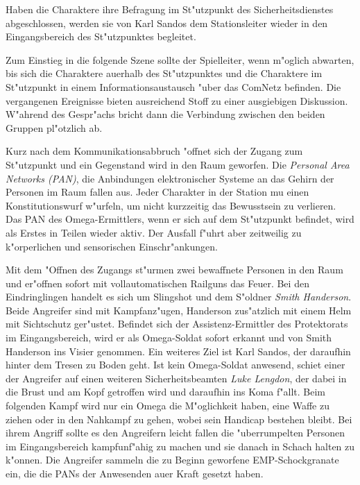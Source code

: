 
Haben die Charaktere ihre Befragung im St"utzpunkt des Sicherheitsdienstes abgeschlossen, werden sie von Karl Sandos dem Stationsleiter wieder in den Eingangsbereich des St"utzpunktes begleitet. 

Zum Einstieg in die folgende Szene sollte der Spielleiter, wenn m"oglich abwarten, bis sich die Charaktere au\3erhalb des St"utzpunktes und die Charaktere im St"utzpunkt in einem Informationsaustausch "uber das ComNetz befinden. Die vergangenen Ereignisse bieten ausreichend Stoff zu einer ausgiebigen Diskussion. W"ahrend des Gespr"achs bricht dann die Verbindung zwischen den beiden Gruppen pl"otzlich ab. 


Kurz nach dem Kommunikationsabbruch "offnet sich der Zugang zum St"utzpunkt und ein Gegenstand wird in den Raum geworfen. Die \emph{Personal Area Networks (PAN)}, die Anbindungen elektronischer Systeme an das Gehirn der Personen im Raum fallen aus. Jeder Charakter in der Station mu\3 einen Konstitutionswurf w"urfeln, um nicht kurzzeitig das Bewusstsein zu verlieren. Das PAN des Omega-Ermittlers, wenn er sich auf dem St"utzpunkt befindet, wird als Erstes in Teilen wieder aktiv. Der Ausfall f"uhrt aber zeitweilig zu k"orperlichen und sensorischen Einschr"ankungen.

Mit dem "Offnen des Zugangs st"urmen zwei bewaffnete Personen in den Raum und er"offnen sofort mit vollautomatischen Railguns das Feuer. Bei den Eindringlingen handelt es sich um Slingshot und dem S"oldner \emph{Smith Handerson}. Beide Angreifer sind mit Kampfanz"ugen, Handerson zus"atzlich mit einem Helm mit Sichtschutz ger"ustet. Befindet sich der Assistenz-Ermittler des Protektorats im Eingangsbereich, wird er als Omega-Soldat sofort erkannt und von Smith Handerson ins Visier genommen. Ein weiteres Ziel ist Karl Sandos, der daraufhin hinter dem Tresen zu Boden geht. Ist kein Omega-Soldat anwesend, schie\3t einer der Angreifer auf einen weiteren Sicherheitsbeamten \emph{Luke Lengdon}, der dabei in die Brust und am Kopf getroffen wird und daraufhin ins Koma f"allt. Beim folgenden Kampf wird nur ein Omega die M"oglichkeit haben, eine Waffe zu ziehen oder in den Nahkampf zu gehen, wobei sein Handicap bestehen bleibt. Bei ihrem Angriff sollte es den Angreifern leicht fallen die "uberrumpelten Personen im Eingangsbereich kampfunf"ahig zu machen und sie danach in Schach halten zu k"onnen. Die Angreifer sammeln die zu Beginn geworfene EMP-Schockgranate ein, die die PANs der Anwesenden au\3er Kraft gesetzt haben.

